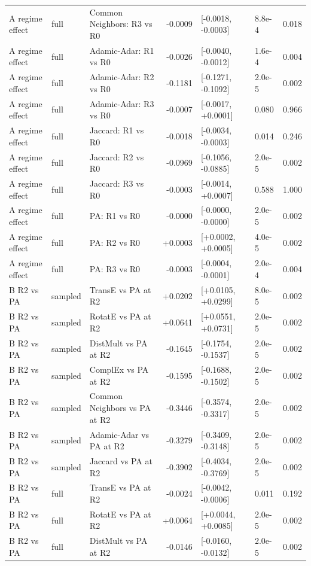 \begin{tabular}{lllrlll}
A regime effect & full & Common Neighbors: R3 vs R0 & -0.0009 & [-0.0018, -0.0003] & 8.8e-4 & 0.018 \\
A regime effect & full & Adamic-Adar: R1 vs R0 & -0.0026 & [-0.0040, -0.0012] & 1.6e-4 & 0.004 \\
A regime effect & full & Adamic-Adar: R2 vs R0 & -0.1181 & [-0.1271, -0.1092] & 2.0e-5 & 0.002 \\
A regime effect & full & Adamic-Adar: R3 vs R0 & -0.0007 & [-0.0017, +0.0001] & 0.080 & 0.966 \\
A regime effect & full & Jaccard: R1 vs R0 & -0.0018 & [-0.0034, -0.0003] & 0.014 & 0.246 \\
A regime effect & full & Jaccard: R2 vs R0 & -0.0969 & [-0.1056, -0.0885] & 2.0e-5 & 0.002 \\
A regime effect & full & Jaccard: R3 vs R0 & -0.0003 & [-0.0014, +0.0007] & 0.588 & 1.000 \\
A regime effect & full & PA: R1 vs R0 & -0.0000 & [-0.0000, -0.0000] & 2.0e-5 & 0.002 \\
A regime effect & full & PA: R2 vs R0 & +0.0003 & [+0.0002, +0.0005] & 4.0e-5 & 0.002 \\
A regime effect & full & PA: R3 vs R0 & -0.0003 & [-0.0004, -0.0001] & 2.0e-4 & 0.004 \\
B R2 vs PA & sampled & TransE vs PA at R2 & +0.0202 & [+0.0105, +0.0299] & 8.0e-5 & 0.002 \\
B R2 vs PA & sampled & RotatE vs PA at R2 & +0.0641 & [+0.0551, +0.0731] & 2.0e-5 & 0.002 \\
B R2 vs PA & sampled & DistMult vs PA at R2 & -0.1645 & [-0.1754, -0.1537] & 2.0e-5 & 0.002 \\
B R2 vs PA & sampled & ComplEx vs PA at R2 & -0.1595 & [-0.1688, -0.1502] & 2.0e-5 & 0.002 \\
B R2 vs PA & sampled & Common Neighbors vs PA at R2 & -0.3446 & [-0.3574, -0.3317] & 2.0e-5 & 0.002 \\
B R2 vs PA & sampled & Adamic-Adar vs PA at R2 & -0.3279 & [-0.3409, -0.3148] & 2.0e-5 & 0.002 \\
B R2 vs PA & sampled & Jaccard vs PA at R2 & -0.3902 & [-0.4034, -0.3769] & 2.0e-5 & 0.002 \\
B R2 vs PA & full & TransE vs PA at R2 & -0.0024 & [-0.0042, -0.0006] & 0.011 & 0.192 \\
B R2 vs PA & full & RotatE vs PA at R2 & +0.0064 & [+0.0044, +0.0085] & 2.0e-5 & 0.002 \\
B R2 vs PA & full & DistMult vs PA at R2 & -0.0146 & [-0.0160, -0.0132] & 2.0e-5 & 0.002 \\

\end{tabular}
